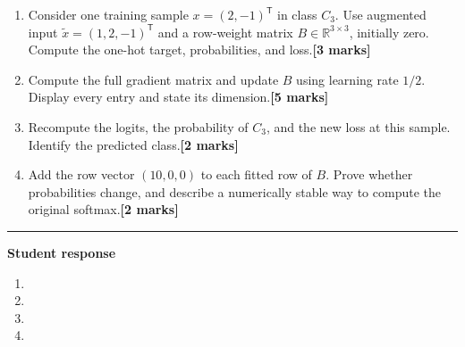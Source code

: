 \documentclass[11pt,a4paper]{article}
\newlength{\BlankAnswerHeight}\setlength{\BlankAnswerHeight}{16mm}
\newcommand{\AnswerBlank}{\leavevmode\par\vspace{\BlankAnswerHeight}}
\begin{document}
\begin{enumerate}[label=(\alph*),leftmargin=8mm,itemsep=3pt]
\item Consider one training sample \(x=(2,-1)^{\mathsf T}\) in class \(C_3\). Use augmented input \(\widetilde x=(1,2,-1)^{\mathsf T}\) and a row-weight matrix \(B\in\mathbb R^{3\times3}\), initially zero. Compute the one-hot target, probabilities, and loss.\hfill\textbf{[3 marks]}
\item Compute the full gradient matrix and update \(B\) using learning rate \(1/2\). Display every entry and state its dimension.\hfill\textbf{[5 marks]}
\item Recompute the logits, the probability of \(C_3\), and the new loss at this sample. Identify the predicted class.\hfill\textbf{[2 marks]}
\item Add the row vector \((10,0,0)\) to each fitted row of \(B\). Prove whether probabilities change, and describe a numerically stable way to compute the original softmax.\hfill\textbf{[2 marks]}
\end{enumerate}\par\medskip\hrule\medskip\textbf{Student response}\par
\begin{enumerate}[label=(\alph*),leftmargin=8mm,itemsep=3pt]
\item
\AnswerBlank
\item
\AnswerBlank
\item
\AnswerBlank
\item
\AnswerBlank
\end{enumerate}
\end{document}
